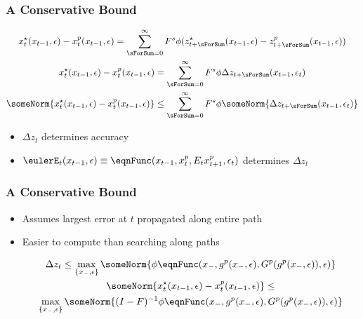 \documentclass[notheorems]{beamer}
\begin{document}
\begin{frame}
  \frametitle{A Conservative Bound}
  

  \begin{gather}
    \label{eq:3}
	 x^\star_{t}(x_{t-1},\epsilon) -	 x^p_{t}(x_{t-1},\epsilon) =
\sum_{\sForSum=0}^\infty F^s \phi (z^\star_{t+\sForSum}(x_{t-1},\epsilon)-z^p_{t+\sForSum}(x_{t-1},\epsilon))     \\
	 x^\star_{t}(x_{t-1},\epsilon) -	 x^p_{t}(x_{t-1},\epsilon) =
\sum_{\sForSum=0}^\infty F^s \phi \Delta z_{t+\sForSum}(x_{t-1},\epsilon_t)   \\ 
	\someNorm{ x^\star_{t}(x_{t-1},\epsilon) -	 x^p_{t}(x_{t-1},\epsilon)} \le
\sum_{\sForSum=0}^\infty F^s \phi \someNorm{\Delta z_{t+\sForSum}(x_{t-1},\epsilon_t)}    
  \end{gather}
  \begin{itemize}
  \item $\Delta z_t$ determines accuracy
\item $\eulerE_t(x_{t-1},\epsilon)\equiv
\eqnFunc(x_{t-1},x^p_t,E_tx^p_{t+1},\epsilon_t)$ determines $\Delta z_t$ 
  \end{itemize}


\end{frame}
\begin{frame}
  \frametitle{A Conservative Bound}
  
  \begin{itemize}
  \item Assumes largest error at $t$ propagated along entire path 
  \item Easier to compute than searching along paths



  \begin{gather}
  \Delta z_t \le  \label{eq:3}
\max_{\{x_{-},\epsilon\}} \someNorm{ \phi \eqnFunc(x_{-},g^p(x_{-},\epsilon),G^p(g^p(x_{-},\epsilon)),\epsilon) }\\
	\someNorm{ x^\star_{t}(x_{t-1},\epsilon) -	 x^p_{t}(x_{t-1},\epsilon)} \le
\\ \max_{\{x_{-},\epsilon\}} \someNorm{(I-F)^{-1} \phi \eqnFunc(x_{-},g^p(x_{-},\epsilon),G^p(g^p(x_{-},\epsilon)),\epsilon) }
  \end{gather}

  \end{itemize}
\end{frame}


\end{document}
